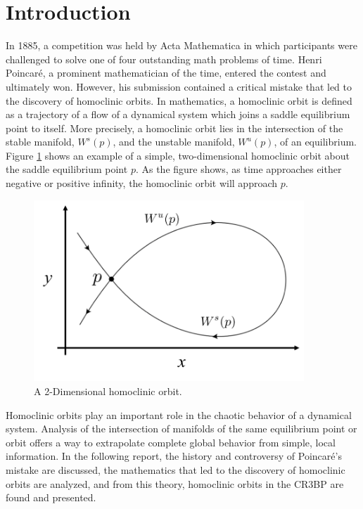 \documentclass[11pt]{article} %
\title{\color{red}{We need a title, boi}}
\author{Luke Bury \& Don Kuettel}
\begin{document}
\maketitle
\section*{Introduction}
In 1885, a competition was held by Acta Mathematica in which participants were challenged to solve one of four outstanding math problems of time. Henri Poincaré, a prominent mathematician of the time, entered the contest and ultimately won. However, his submission contained a critical mistake that led to the discovery of homoclinic orbits. In mathematics, a homoclinic orbit is defined as a trajectory of a flow of a dynamical system which joins a saddle equilibrium point to itself. More precisely, a homoclinic orbit lies in the intersection of the stable manifold, $W^s(p)$, and the unstable manifold, $W^u(p)$, of an equilibrium. Figure \ref{f:homoclinic_example} shows an example of a simple, two-dimensional homoclinic orbit about the saddle equilibrium point $p$. As the figure shows, as time approaches either negative or positive infinity, the homoclinic orbit will approach $p$. 

\begin{figure}[H]
    \centering
    \includegraphics[width=4in]{homoclinic_orbit.png}
    \caption{A 2-Dimensional homoclinic orbit.}
    \label{f:homoclinic_example}
\end{figure}

Homoclinic orbits play an important role in the chaotic behavior of a dynamical system. Analysis of the intersection of manifolds of the same equilibrium point or orbit offers a way to extrapolate complete global behavior from simple, local information. In the following report, the history and controversy of Poincaré's mistake are discussed, the mathematics that led to the discovery of homoclinic orbits are analyzed, and from this theory, homoclinic orbits in the CR3BP are found and presented. 
\end{document}
